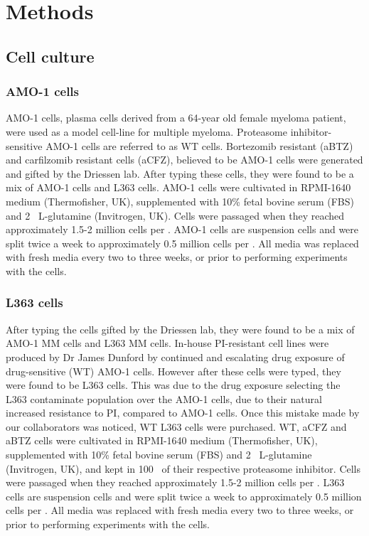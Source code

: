 \chapter{\label{ch:3-methods}Methods}


\section{Cell culture}
\subsection{AMO-1 cells}
AMO-1 cells, plasma cells derived from a 64-year old female myeloma patient, were used as a model cell-line for multiple myeloma. %
Proteasome inhibitor-sensitive AMO-1 cells are referred to as WT cells.
Bortezomib resistant (aBTZ) and carfilzomib resistant cells (aCFZ), believed to be AMO-1 cells were generated and gifted by the Driessen lab\cite{soriano2016proteasome}.
After typing these cells, they were found to be a mix of AMO-1 cells and L363 cells.
AMO-1 cells were cultivated in RPMI-1640 medium (Thermofisher, UK), supplemented with 10\% fetal bovine serum (FBS) and 2\si{\milli\Molar} L-glutamine (Invitrogen, UK).
Cells were passaged when they reached approximately 1.5-2 million cells per \ml{}.
AMO-1 cells are suspension cells and were split twice a week to approximately 0.5 million cells per \ml{}.
All media was replaced with fresh media every two to three weeks, or prior to performing experiments with the cells.

\subsection{L363 cells}
After typing the cells gifted by the Driessen lab, they were found to be a mix of AMO-1 MM cells and L363 MM cells.
In-house PI-resistant cell lines were produced by Dr James Dunford by continued and escalating drug exposure of drug-sensitive (WT) AMO-1 cells.
However after these cells were typed, they were found to be L363 cells.
This was due to the drug exposure selecting the L363 contaminate population over the AMO-1 cells, due to their natural increased resistance to PI, compared to AMO-1 cells.
Once this mistake made by our collaborators was noticed, WT L363 cells were purchased.
WT, aCFZ and aBTZ cells were cultivated in RPMI-1640 medium (Thermofisher, UK), supplemented with 10\% fetal bovine serum (FBS) and 2\si{\milli\Molar} L-glutamine (Invitrogen, UK), and kept in 100\si{\nano\Molar} of their respective proteasome inhibitor.
Cells were passaged when they reached approximately 1.5-2 million cells per \ml{}.
L363 cells are suspension cells and were split twice a week to approximately 0.5 million cells per \ml{}.
All media was replaced with fresh media every two to three weeks, or prior to performing experiments with the cells.


